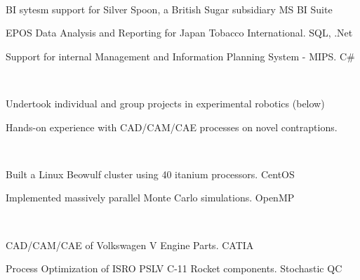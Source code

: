 \documentclass[]{deedy-resume-openfont}
\begin{document}
\begin{minipage}[t]{0.66\textwidth}
\\
\vspace{\topsep} %
\begin{tightemize}
\item BI sytesm support for Silver Spoon, a British Sugar subsidiary \hfill {
\selectfont MS BI Suite}
	\item EPOS Data Analysis and Reporting for Japan Tobacco International. \hfill{
\selectfont SQL, .Net}
	\item  Support for internal Management and Information Planning System - MIPS. \hfill{ \selectfont C\#}
\end{tightemize}
\sectionsep

\\
\vspace{\topsep}
\begin{tightemize}
\item Undertook individual and group projects in experimental robotics \hfill{ \selectfont (below)}
\item Hands-on experience with CAD/CAM/CAE processes on novel contraptions.
\end{tightemize}
\sectionsep

\\
\vspace{\topsep}
\begin{tightemize}
\item Built a Linux Beowulf cluster using 40 itanium processors. \hfill{ \selectfont CentOS}
\item Implemented massively parallel Monte Carlo simulations. \hfill{ \selectfont OpenMP}
\end{tightemize}
\sectionsep


\\
\vspace{\topsep}
\begin{tightemize}\item CAD/CAM/CAE of Volkswagen V Engine Parts. \hfill{ \selectfont CATIA}
\item Process Optimization of ISRO PSLV C-11 Rocket components. \hfill{ \selectfont Stochastic QC}
\end{tightemize}
\sectionsep


\end{minipage}
\end{document}
